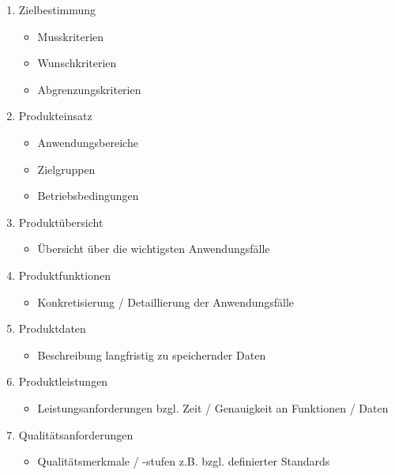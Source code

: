 \documentclass{lehramt-informatik}
\begin{document}
\begin{enumerate}
\item Zielbestimmung

\begin{itemize}
\item Musskriterien
\item Wunschkriterien
\item Abgrenzungskriterien
\end{itemize}

\item Produkteinsatz

\begin{itemize}
\item Anwendungsbereiche
\item Zielgruppen
\item Betriebsbedingungen
\end{itemize}

\item Produktübersicht

\begin{itemize}
\item Übersicht über die wichtigsten Anwendungsfälle
\end{itemize}

\item Produktfunktionen

\begin{itemize}
\item Konkretisierung / Detaillierung der Anwendungsfälle
\end{itemize}

\item Produktdaten

\begin{itemize}
\item Beschreibung langfristig zu speichernder Daten
\end{itemize}

\item Produktleistungen

\begin{itemize}
\item Leistungsanforderungen bzgl. Zeit / Genauigkeit an Funktionen / Daten
\end{itemize}

\item Qualitätsanforderungen

\begin{itemize}
\item Qualitätsmerkmale / -stufen z.B. bzgl. definierter Standards
\end{itemize}


\end{enumerate}
\end{document}
